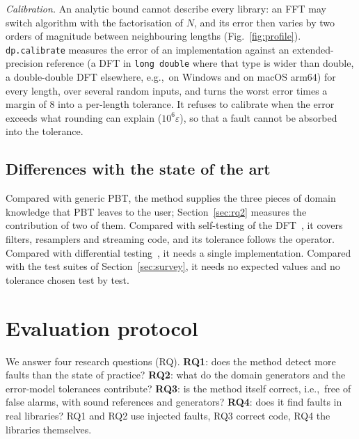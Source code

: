 \documentclass[10pt,conference]{IEEEtran}
\newcommand{\eps}{\varepsilon}
\newcommand{\code}[1]{\texttt{#1}}
\newcommand{\ie}{i.e.,\ }
\newcommand{\eg}{e.g.,\ }
\begin{document}
\emph{Calibration.} An analytic bound cannot describe every library: an FFT
may switch algorithm with the factorisation of $N$, and its error then varies by
two orders of magnitude between neighbouring lengths (Fig.~\ref{fig:profile}).
\code{dp.calibrate} measures the error of an implementation against an
extended-precision reference (a DFT in \code{long double} where that type is
wider than double, a double-double DFT elsewhere, \eg on Windows and on
macOS arm64) for every length, over several random inputs, and
turns the worst error times a margin of 8 into a per-length tolerance. It
refuses to calibrate when the error exceeds what rounding can explain
($10^6\eps$), so that a fault cannot be absorbed into the tolerance.

\subsection{Differences with the state of the art}
Compared with generic PBT, the method supplies the three pieces of domain
knowledge that PBT leaves to the user; Section~\ref{sec:rq2} measures the
contribution of two of them. Compared with self-testing of the
DFT~\cite{ergun1995testing,fftwverify}, it covers filters, resamplers and
streaming code, and its tolerance follows the operator. Compared with
differential testing~\cite{vanover2020fpdiff}, it needs a single implementation.
Compared with the test suites of Section~\ref{sec:survey}, it needs no expected
values and no tolerance chosen test by test.

\section{Evaluation protocol}
\label{sec:protocol}

We answer four research questions (RQ).
\textbf{RQ1}: does the method detect more faults than the state of practice?
\textbf{RQ2}: what do the domain generators and the error-model tolerances contribute?
\textbf{RQ3}: is the method itself correct, \ie free of false alarms, with sound references and generators?
\textbf{RQ4}: does it find faults in real libraries?
RQ1 and RQ2 use injected faults, RQ3 correct code, RQ4 the libraries
themselves.
\end{document}
